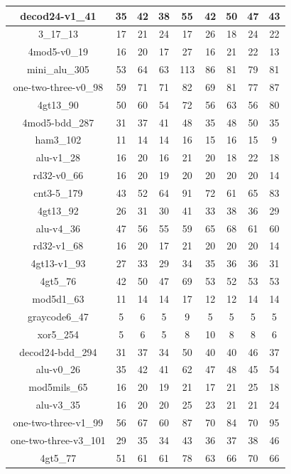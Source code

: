 \begin{longtable}[c]{|c|c|c|c|c|c|c|c|c|}
decod24-v1\_41 & 35 & 42 & 38 & 55 & 42 & 50 & 47 & 43 \\ \hline
3\_17\_13 & 17 & 21 & 24 & 17 & 26 & 18 & 24 & 22 \\ \hline
4mod5-v0\_19 & 16 & 20 & 17 & 27 & 16 & 21 & 22 & 13 \\ \hline
mini\_alu\_305 & 53 & 64 & 63 & 113 & 86 & 81 & 79 & 81 \\ \hline
one-two-three-v0\_98 & 59 & 71 & 71 & 82 & 69 & 81 & 77 & 87 \\ \hline
4gt13\_90 & 50 & 60 & 54 & 72 & 56 & 63 & 56 & 80 \\ \hline
4mod5-bdd\_287 & 31 & 37 & 41 & 48 & 35 & 48 & 50 & 35 \\ \hline
ham3\_102 & 11 & 14 & 14 & 16 & 15 & 16 & 15 & 9 \\ \hline
alu-v1\_28 & 16 & 20 & 16 & 21 & 20 & 18 & 22 & 18 \\ \hline
rd32-v0\_66 & 16 & 20 & 19 & 20 & 20 & 20 & 20 & 14 \\ \hline
cnt3-5\_179 & 43 & 52 & 64 & 91 & 72 & 61 & 65 & 83 \\ \hline
4gt13\_92 & 26 & 31 & 30 & 41 & 33 & 38 & 36 & 29 \\ \hline
alu-v4\_36 & 47 & 56 & 55 & 59 & 65 & 68 & 61 & 60 \\ \hline
rd32-v1\_68 & 16 & 20 & 17 & 21 & 20 & 20 & 20 & 14 \\ \hline
4gt13-v1\_93 & 27 & 33 & 29 & 34 & 35 & 36 & 36 & 31 \\ \hline
4gt5\_76 & 42 & 50 & 47 & 69 & 53 & 52 & 53 & 53 \\ \hline
mod5d1\_63 & 11 & 14 & 14 & 17 & 12 & 12 & 14 & 14 \\ \hline
graycode6\_47 & 5 & 6 & 5 & 9 & 5 & 5 & 5 & 5 \\ \hline
xor5\_254 & 5 & 6 & 5 & 8 & 10 & 8 & 8 & 6 \\ \hline
decod24-bdd\_294 & 31 & 37 & 34 & 50 & 40 & 40 & 46 & 37 \\ \hline
alu-v0\_26 & 35 & 42 & 41 & 62 & 47 & 48 & 45 & 54 \\ \hline
mod5mils\_65 & 16 & 20 & 19 & 21 & 17 & 21 & 25 & 18 \\ \hline
alu-v3\_35 & 16 & 20 & 20 & 25 & 23 & 21 & 21 & 24 \\ \hline
one-two-three-v1\_99 & 56 & 67 & 60 & 87 & 70 & 84 & 70 & 95 \\ \hline
one-two-three-v3\_101 & 29 & 35 & 34 & 43 & 36 & 37 & 38 & 46 \\ \hline
4gt5\_77 & 51 & 61 & 61 & 78 & 63 & 66 & 70 & 66 \\ \hline
\end{longtable}

